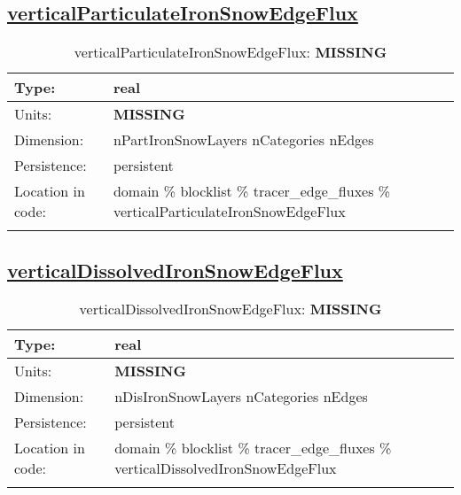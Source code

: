 \subsection[verticalParticulateIronSnowEdgeFlux]{\hyperref[sec:var_tab_tracer_edge_fluxes]{verticalParticulateIronSnowEdgeFlux}}
\label{subsec:var_sec_tracer_edge_fluxes_verticalParticulateIronSnowEdgeFlux}
\begin{center}
\begin{longtable}{| p{2.0in} | p{4.0in} |}
        \hline 
        Type: & real \\
        \hline 
        Units: & {\bf \color{red} MISSING} \\
        \hline 
        Dimension: & nPartIronSnowLayers nCategories nEdges \\
        \hline 
        Persistence: & persistent \\
        \hline 
         Location in code: & domain \% blocklist \% tracer\_edge\_fluxes \% verticalParticulateIronSnowEdgeFlux \\
         \hline 
    \caption{verticalParticulateIronSnowEdgeFlux: {\bf \color{red} MISSING}}
\end{longtable}
\end{center}
\subsection[verticalDissolvedIronSnowEdgeFlux]{\hyperref[sec:var_tab_tracer_edge_fluxes]{verticalDissolvedIronSnowEdgeFlux}}
\label{subsec:var_sec_tracer_edge_fluxes_verticalDissolvedIronSnowEdgeFlux}
\begin{center}
\begin{longtable}{| p{2.0in} | p{4.0in} |}
        \hline 
        Type: & real \\
        \hline 
        Units: & {\bf \color{red} MISSING} \\
        \hline 
        Dimension: & nDisIronSnowLayers nCategories nEdges \\
        \hline 
        Persistence: & persistent \\
        \hline 
         Location in code: & domain \% blocklist \% tracer\_edge\_fluxes \% verticalDissolvedIronSnowEdgeFlux \\
         \hline 
    \caption{verticalDissolvedIronSnowEdgeFlux: {\bf \color{red} MISSING}}
\end{longtable}
\end{center}
